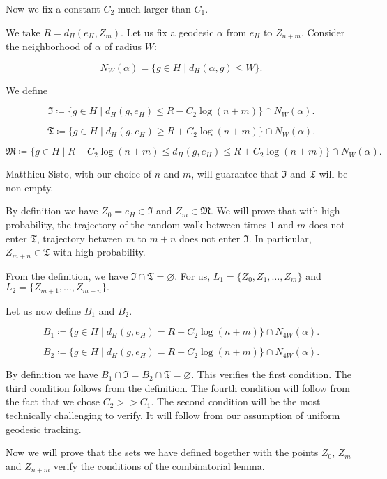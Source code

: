 Now we fix a constant $C_2$ much larger than $C_1$. 

We take $R=d_H(e_H,Z_m)$. Let us fix a geodesic $\alpha$ from $e_H$ to $Z_{n+m}$.  Consider the neighborhood of $\alpha$ of radius $W$:

$$
N_{W}(\alpha)=\{g\in H\mid d_H(\alpha, g)\le W\}.
$$

 We define 

\[
\mathfrak{I}\coloneqq \{g\in H\mid d_H(g,e_H)\le R-C_2\log(n+m)\}\cap N_W(\alpha).
\]

\[
\mathfrak{T}\coloneqq \{g\in H\mid d_H(g,e_H)\ge R+C_2\log(n+m)\}\cap N_W(\alpha).
\]

\[
\mathfrak{M}\coloneqq \{g\in H\mid R-C_2\log(n+m) \le d_H(g,e_H)\le R+C_2\log(n+m)\}\cap N_W(\alpha).
\]


Matthieu-Sisto, with our choice of $n$ and $m$, will guarantee that $\mathfrak{I}$ and $\mathfrak{T}$ will be non-empty.

By definition we have $Z_0=e_H\in \mathfrak{I}$ and $Z_m\in \mathfrak{M}$. We will prove that with high probability, the trajectory of the random walk between times $1$ and $m$ does not enter $\mathfrak{T}$, trajectory between $m$ to $m+n$ does not enter $\mathfrak{I}$. In particular, $Z_{m+n}\in \mathfrak{T}$ with high probability.

From the definition, we have $\mathfrak{I}\cap \mathfrak{T}=\varnothing$. For us, $L_1=\{Z_0,Z_1,\ldots, Z_m\}$ and $L_2=\{Z_{m+1},\ldots, Z_{m+n}\}.$

Let us now define $B_1$ and $B_2$.

\[
B_1\coloneqq \{g\in H\mid d_H(g,e_H)=R-C_2\log(n+m)\}\cap N_{4W}(\alpha).
\]

\[
B_2\coloneqq \{g\in H\mid d_H(g,e_H)=R+C_2\log(n+m)\}\cap N_{4W}(\alpha).
\]

By definition we have $B_1\cap \mathfrak{I}=B_2\cap \mathfrak{T}=\varnothing$. This verifies the first condition. The third condition follows from the definition. The fourth condition will follow from the fact that we chose $C_2>>C_1$. The second condition will be the most technically challenging to verify. It will follow from our assumption of uniform geodesic tracking.

Now we will prove that the sets we have defined together with the points $Z_0$, $Z_m$ and $Z_{n+m}$ verify the conditions of the combinatorial lemma.



